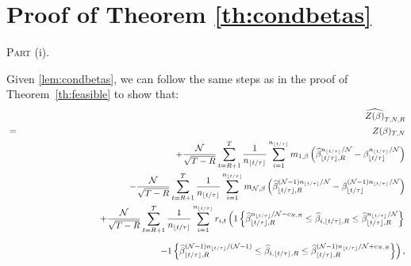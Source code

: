 
\section{Proof of Theorem \cref{th:condbetas}}
\label{Proof of th:condbetas}

{\small \noindent \textsc{Part} (i). }

{\small Given \ref{lem:condbetas}, we can follow the same steps as in the
proof of Theorem\ \ref{th:feasible} to show that:%
\begin{eqnarray}
&&\widehat{Z(\beta )}_{T,N,R}  \notag \\
&=&Z(\beta )_{T,N}  \notag \\
&&+\frac{\mathcal{N}}{\sqrt{T-R}}\sum_{t=R+1}^{T}\frac{1}{n_{\lfloor t/\tau
\rfloor }}\sum_{i=1}^{n_{\lfloor t/\tau \rfloor }}m_{1,\beta }\left( 
\widehat{\beta }_{\lfloor t/\tau \rfloor ,R}^{n_{\lfloor t/\tau \rfloor }/%
\mathcal{N}}-\beta _{\lfloor t/\tau \rfloor }^{n_{\lfloor t/\tau \rfloor }/%
\mathcal{N}}\right)  \notag \\
&&-\frac{\mathcal{N}}{\sqrt{T-R}}\sum_{t=R+1}^{T}\frac{1}{n_{\lfloor t/\tau
\rfloor }}\sum_{i=1}^{n_{\lfloor t/\tau \rfloor }}m_{\mathcal{N},\beta
}\left( \widehat{\beta }_{\lfloor t/\tau \rfloor ,R}^{(\mathcal{N}%
-1)n_{\lfloor t/\tau \rfloor }/\mathcal{N}}-\beta _{\lfloor t/\tau \rfloor
}^{(\mathcal{N}-1)n_{\lfloor t/\tau \rfloor }/\mathcal{N}}\right)  \notag \\
&&+\frac{\mathcal{N}}{\sqrt{T-R}}\sum_{t=R+1}^{T}\frac{1}{n_{\lfloor t/\tau
\rfloor }}\sum_{i=1}^{n_{\lfloor t/\tau \rfloor }}r_{i,t}\left( 1\left\{ 
\widehat{\beta }_{\lfloor t/\tau \rfloor ,R}^{n_{\lfloor t/\tau \rfloor }/%
\mathcal{N}-c_{N,R}}\leq \widehat{\beta }_{i,\lfloor t/\tau \rfloor ,R}\leq 
\widehat{\beta }_{\lfloor t/\tau \rfloor ,R}^{n_{\lfloor t/\tau \rfloor }/%
\mathcal{N}}\right\} \right.  \notag \\
&&\phantom{+\frac{\mathcal{N}}{\sqrt{T-R}}\sum_{t=R+1}^{T}\frac{1}{n_{%
\lfloor t/\tau \rfloor }}\sum_{i=1}^{n_{\lfloor t/\tau \rfloor
}}r_{i,t}\left( \right.}\left. -1\left\{ \widehat{\beta }_{\lfloor t/\tau
\rfloor ,R}^{(\mathcal{N}-1)n_{\lfloor t/\tau \rfloor }/(\mathcal{N}-1)}\leq 
\widehat{\beta }_{i,\lfloor t/\tau \rfloor ,R}\leq \widehat{\beta }_{\lfloor
t/\tau \rfloor ,R}^{(\mathcal{N}-1)n_{\lfloor t/\tau \rfloor }/\mathcal{N}%
+c_{N,R}}\right\} \right) ,  \label{last-beta}
\end{eqnarray}%
}
